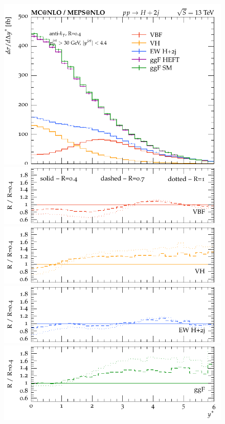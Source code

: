 \documentclass[10pt,prd,fleqn,superscriptaddress,notitlepage,nofootinbib,preprintnumbers,nobalancelastpage]{revtex4-1}
\begin{document}
\begin{figure}[p]
  \centering
  \begin{minipage}{.2925\textwidth}
    \includegraphics[width=\textwidth]{figures/channels/y_star.pdf}
    \includegraphics[width=\textwidth]{figures/channels/y_star_rVBF.pdf}
    \includegraphics[width=\textwidth]{figures/channels/y_star_rVH.pdf}
    \includegraphics[width=\textwidth]{figures/channels/y_star_rHJJ.pdf}
    \includegraphics[width=\textwidth]{figures/channels/y_star_rGGH.pdf}

\end{minipage}
\end{figure}
\end{document}
